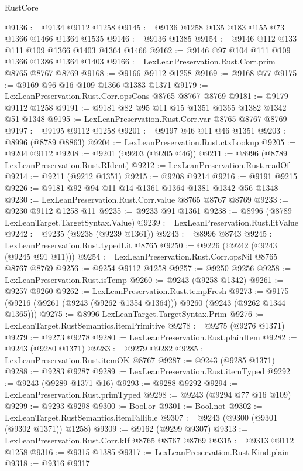 \begin{lexlean}{RustCore}
\begin{coremodule}
@9136 := @9134 @9112 @1258
@9145 := @9136 @1258 @135 @183 @155 @73 @1366 @1466 @1364 @1535
@9146 := @9136 @1385
@9154 := @9146 @112 @133 @111 @109 @1366 @1403 @1364 @1466
@9162 := @9146 @97 @104 @111 @109 @1366 @1386 @1364 @1403
@9166 := LexLeanPreservation.Rust.Corr.prim @8765 @8767 @8769
@9168 := @9166 @9112 @1258
@9169 := @9168 @77
@9175 := @9169 @96 @16 @109 @1366 @1383 @1371
@9179 := LexLeanPreservation.Rust.Corr.opsCons @8765 @8767 @8769
@9181 := @9179 @9112 @1258
@9191 := @9181 @82 @95 @11 @15 @1351 @1365 @1382 @1342 @51 @1348
@9195 := LexLeanPreservation.Rust.Corr.var @8765 @8767 @8769
@9197 := @9195 @9112 @1258
@9201 := @9197 @46 @11 @46 @1351
@9203 := @8996 (@8789 @8863)
@9204 := LexLeanPreservation.Rust.ctxLookup
@9205 := @9204 @9112
@9208 := @9201 (@9203 (@9205 @46))
@9211 := @8996 (@8789 LexLeanPreservation.Rust.RIdent)
@9212 := LexLeanPreservation.Rust.readOf
@9214 := @9211 (@9212 @1351)
@9215 := @9208 @9214
@9216 := @9191 @9215
@9226 := @9181 @92 @94 @11 @14 @1361 @1364 @1381 @1342 @56 @1348
@9230 := LexLeanPreservation.Rust.Corr.value @8765 @8767 @8769
@9233 := @9230 @9112 @1258 @11
@9235 := @9233 @91 @1361
@9238 := @8996 (@8789 LexLeanTarget.TargetSyntax.Value)
@9239 := LexLeanPreservation.Rust.litValue
@9242 := @9235 (@9238 (@9239 @1361))
@9243 := @8996 @8743
@9245 := LexLeanPreservation.Rust.typedLit @8765
@9250 := @9226 (@9242 (@9243 (@9245 @91 @11)))
@9254 := LexLeanPreservation.Rust.Corr.opsNil @8765 @8767 @8769
@9256 := @9254 @9112 @1258
@9257 := @9250 @9256
@9258 := LexLeanPreservation.Rust.isTemp
@9260 := @9243 (@9258 @1342)
@9261 := @9257 @9260
@9262 := LexLeanPreservation.Rust.tempFresh
@9273 := @9175 (@9216 (@9261 (@9243 (@9262 @1354 @1364))) @9260 (@9243 (@9262 @1344 @1365)))
@9275 := @8996 LexLeanTarget.TargetSyntax.Prim
@9276 := LexLeanTarget.RustSemantics.itemPrimitive
@9278 := @9275 (@9276 @1371)
@9279 := @9273 @9278
@9280 := LexLeanPreservation.Rust.plainItem
@9282 := @9243 (@9280 @1371)
@9283 := @9279 @9282
@9285 := LexLeanPreservation.Rust.itemOK @8767
@9287 := @9243 (@9285 @1371)
@9288 := @9283 @9287
@9289 := LexLeanPreservation.Rust.itemTyped
@9292 := @9243 (@9289 @1371 @16)
@9293 := @9288 @9292
@9294 := LexLeanPreservation.Rust.primTyped
@9298 := @9243 (@9294 @77 @16 @109)
@9299 := @9293 @9298
@9300 := Bool.or
@9301 := Bool.not
@9302 := LexLeanTarget.RustSemantics.itemFallible
@9307 := @9243 (@9300 (@9301 (@9302 @1371)) @1258)
@9309 := @9162 (@9299 @9307)
@9313 := LexLeanPreservation.Rust.Corr.kIf @8765 @8767 @8769
@9315 := @9313 @9112 @1258
@9316 := @9315 @1385
@9317 := LexLeanPreservation.Rust.Kind.plain
@9318 := @9316 @9317

\end{coremodule}
\end{lexlean}
